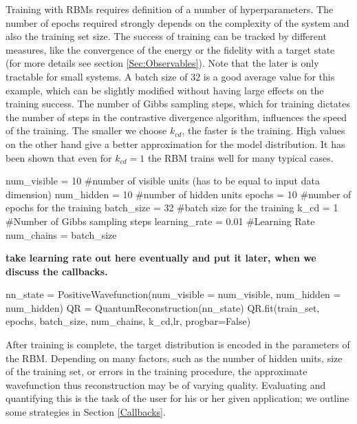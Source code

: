 \documentclass[submission, Phys]{SciPost}
\begin{document}
Training with RBMs requires definition of a number of hyperparameters. 
The number of epochs required strongly depends on the complexity of the system and also the training set size. The success of training can be tracked by different measures, like the convergence of the energy or the fidelity with a target state (for more details see section \ref{Sec:Observables}). Note that the later is only tractable for small systems. A batch size of 32 is a good average value for this example, which can be slightly modified without having large effects on the training success. The number of Gibbs sampling steps,
which for training dictates the number of steps in the contrastive divergence algorithm, 
influences the speed of the training. The smaller we choose $k_{cd}$, the faster is the training. High values on the other hand give a better approximation for the model distribution. It has been shown that even for $k_{cd}=1$ the RBM trains well for many typical cases\cite{hinton2002training}.

\begin{python}
num_visible = 10 #number of visible units (has to be equal to input data dimension)
num_hidden = 10 #number of hidden units
epochs = 10 #number of epochs for the training
batch_size = 32 #batch size for the training
k_cd = 1 #Number of Gibbs sampling steps
learning_rate = 0.01 #Learning Rate
num_chains = batch_size
\end{python}

\textbf{take learning rate out here eventually and put it later, when we discuss the callbacks.}

\begin{python}
nn_state = PositiveWavefunction(num_visible = num_visible,
						                    num_hidden = num_hidden)
QR = QuantumReconstruction(nn_state)
QR.fit(train_set, epochs, batch_size, num_chains, k_cd,lr, progbar=False)
\end{python}


After training is complete, the target distribution is encoded in the parameters of the RBM.   Depending on many factors, such as the number of hidden units, size of the training set, or errors in the training procedure, the approximate wavefunction thus reconstruction may be of varying quality.  Evaluating and quantifying this is the task of the user for his or her given application; we outline some strategies in Section \ref{Callbacks}.  
\end{document}
